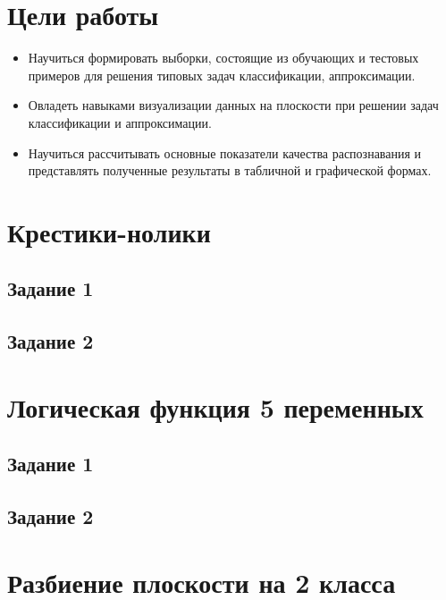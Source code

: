 





\section{Цели работы}

\begin{itemize}
\item Научиться формировать выборки, состоящие из обучающих и тестовых примеров
для решения типовых задач классификации, аппроксимации.
\item Овладеть навыками визуализации данных на плоскости при решении задач
классификации и аппроксимации.
\item Научиться рассчитывать основные показатели качества распознавания и
представлять полученные результаты в табличной и графической формах.
\end{itemize}

\section{Крестики-нолики}

\subsection{Задание 1}

\subsection{Задание 2}

\section{Логическая функция 5 переменных}

\subsection{Задание 1}

\subsection{Задание 2}

\section{Разбиение плоскости на 2 класса}

